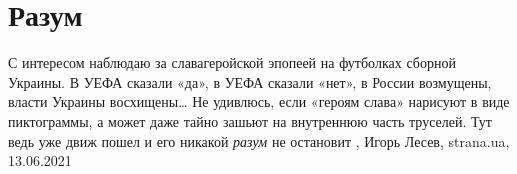  
 
 
 
 
\chapter{Разум}
\label{sec:slova.razum}

С интересом наблюдаю за славагеройской эпопеей на футболках сборной Украины. В
УЕФА сказали «да», в УЕФА сказали «нет», в России возмущены, власти Украины
восхищены… Не удивлюсь, если «героям слава» нарисуют в виде пиктограммы, а
может даже тайно зашьют на внутреннюю часть труселей. Тут ведь уже движ пошел и
его никакой \emph{разум} не остановит
, 
Игорь Лесев, strana.ua, 13.06.2021

